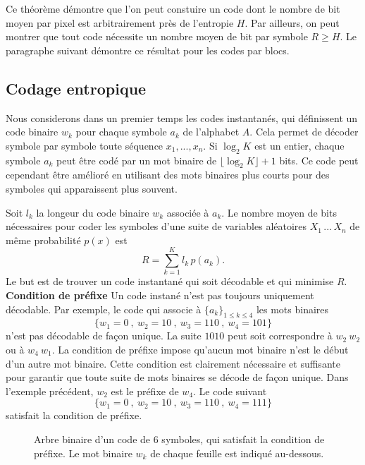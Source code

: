 Ce th\'eor\`eme d\'emontre que l'on peut constuire un code
dont le nombre de bit moyen par pixel est arbitrairement 
pr\`es de l'entropie $H$. Par ailleurs, on peut montrer
que tout code n\'ecessite un nombre
moyen de bit par symbole $R \geq H$. Le paragraphe
suivant d\'emontre ce r\'esultat pour les codes par blocs.

 
\subsection{Codage entropique}
\label{entropy-code-sec} 

Nous considerons dans un premier temps 
les codes instantan\'es, qui d\'efinissent un code binaire
$w_k$ pour chaque symbole $a_k$ de l'alphabet $A$. Cela
permet de d\'ecoder symbole par symbole toute 
s\'equence $x_1, ..., x_n$.
Si $\log_2 K$ est un entier, chaque symbole
$a_k$ peut \^etre cod\'e par un mot binaire de
$\lfloor \log_2 K \rfloor + 1$ bits. 
Ce code peut cependant \^etre am\'elior\'e 
en utilisant des mots
binaires plus courts pour des symboles qui apparaissent plus
souvent.

Soit $l_k$ la longeur du code binaire
$w_k$ associ\'ee \`a $a_k$.
Le nombre moyen de bits n\'ecessaires pour coder les symboles 
d'une suite de variables al\'eatoires $X_1 \, ...\, X_n$ de
m\^eme probabilit\'e $p(x)$ est
\begin{equation}
\label{bit-rate}
R  = \sum_{k=1}^{K} l_k\, p(a_k) .
\end{equation}
Le but est de trouver un code instantan\'e qui soit
d\'ecodable et qui minimise $R$.\\

{\bf Condition de pr\'efixe} 
Un code instan\'e n'est pas toujours uniquement d\'ecodable.
Par exemple, le code qui associe \`a
$\{a_k\}_{1 \leq k \leq 4}$
les mots binaires
\[
\{w_1 = 0 ~,~w_2 = 10 ~,~w_3 = 110 ~,~w_4 = 101 \}
\]
n'est pas d\'ecodable de fa\c{c}on unique.
La suite $1010$ peut soit correspondre
\`a $w_2~w_2$ ou \`a $w_4~ w_1$. 
La condition de pr\'efixe impose qu'aucun mot binaire n'est le
d\'ebut d'un autre mot binaire.
Cette condition est clairement n\'ecessaire et
suffisante pour garantir que
toute suite de mots binaires se d\'ecode de fa\c con unique.
Dans l'exemple pr\'ec\'edent, 
$w_2$ est le pr\'efixe de $w_4$.
Le code suivant
\[
\{w_1 = 0 ~,~w_2 = 10 ~,~w_3 = 110 ~,~w_4 = 111 \}
\]
satisfait la condition de pr\'efixe.


\begin{figure}[bhtp]
\centerline{
        \epsfxsize=5cm
	\leavevmode{}}
\caption{Arbre binaire d'un code de $6$ symboles, 
qui satisfait la condition de pr\'efixe. Le mot binaire
$w_k$ de chaque feuille est indiqu\'e au-dessous.}
\label{prefixe6}
\end{figure}

